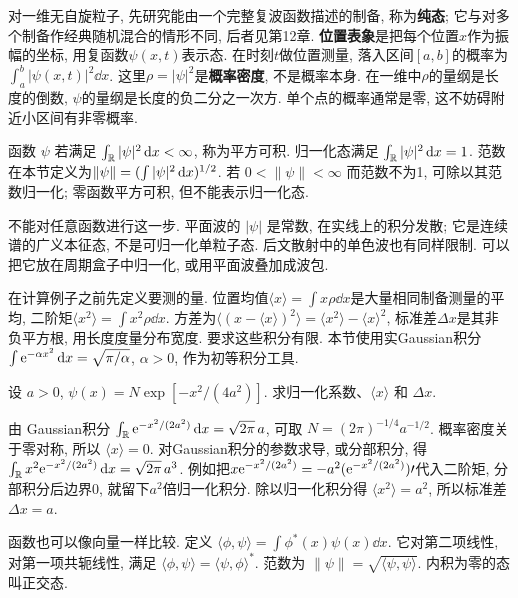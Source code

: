 对一维无自旋粒子, 先研究能由一个完整复波函数描述的制备, 称为\textbf{纯态}; 它与对多个制备作经典随机混合的情形不同, 后者见第12章. \textbf{位置表象}是把每个位置$x$作为振幅的坐标, 用复函数$\psi(x,t)$表示态. 在时刻$t$做位置测量, 落入区间$[a,b]$的概率为$\int_a^b|\psi(x,t)|^2\dd x$. 这里$\rho=|\psi|^2$是\textbf{概率密度}, 不是概率本身. 在一维中$\rho$的量纲是长度的倒数, $\psi$的量纲是长度的负二分之一次方. 单个点的概率通常是零, 这不妨碍附近小区间有非零概率.

\begin{definition}
函数 $\psi$ 若满足 $\int_{\mathbb R}|\psi|^2\,\mathrm d x<\infty$, 称为平方可积. 归一化态满足 $\int_{\mathbb R}|\psi|^2\,\mathrm d x=1$. 范数在本节定义为$\lVert \psi\rVert=(\int|\psi|^2\,\mathrm d x)^{1/2}$. 若 $0<\|\psi\|<\infty$ 而范数不为1, 可除以其范数归一化; 零函数平方可积, 但不能表示归一化态.
\end{definition}
不能对任意函数进行这一步. 平面波的 $|\psi|$ 是常数, 在实线上的积分发散; 它是连续谱的广义本征态, 不是可归一化单粒子态. 后文散射中的单色波也有同样限制. 可以把它放在周期盒子中归一化, 或用平面波叠加成波包.

在计算例子之前先定义要测的量. 位置均值$\langle x\rangle=\int x\rho\dd x$是大量相同制备测量的平均, 二阶矩$\langle x^2\rangle=\int x^2\rho\dd x$. 方差为$\langle(x-\langle x\rangle)^2\rangle=\langle x^2\rangle-\langle x\rangle^2$, 标准差$\Delta x$是其非负平方根, 用长度度量分布宽度. 要求这些积分有限. 本节使用实Gaussian积分$\int\mathrm e^{-\alpha x^2}\,\mathrm d x=\sqrt{\pi/\alpha}$, $\alpha>0$, 作为初等积分工具.

\begin{example}
设 $a>0$, $\psi(x)=N\exp[-x^2/(4a^2)]$. 求归一化系数、$\langle x\rangle$ 和 $\Delta x$.
\end{example}
\begin{solution}
由 Gaussian积分 $\int_\mathbb R\mathrm e^{-x^2/(2a^2)}\,\mathrm d x=\sqrt{2\pi}\,a$, 可取 $N=(2\pi)^{-1/4}a^{-1/2}$. 概率密度关于零对称, 所以 $\langle x\rangle=0$. 对Gaussian积分的参数求导, 或分部积分, 得 $\int_\mathbb R x^2\mathrm e^{-x^2/(2a^2)}\,\mathrm d x=\sqrt{2\pi}\,a^3$. 例如把$x\mathrm e^{-x^2/(2a^2)}=-a^2(\mathrm e^{-x^2/(2a^2)})\prime$代入二阶矩, 分部积分后边界0, 就留下$a^2$倍归一化积分. 除以归一化积分得 $\langle x^2\rangle=a^2$, 所以标准差 $\Delta x=a$.
\end{solution}

函数也可以像向量一样比较. 定义 $\langle\phi,\psi\rangle=\int\phi^*(x)\psi(x)\dd x$. 它对第二项线性, 对第一项共轭线性, 满足 $\langle\phi,\psi\rangle=\langle\psi,\phi\rangle^*$. 范数为 $\|\psi\|=\sqrt{\langle\psi,\psi\rangle}$. 内积为零的态叫正交态.

